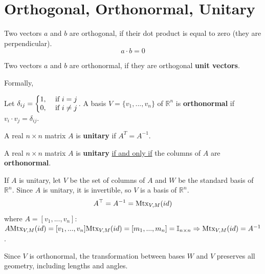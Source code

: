 \documentclass[11pt]{elegantbook}
\begin{document}
\section{Orthogonal, Orthonormal, Unitary}
Two vectors $a$ and $b$ are orthogonal, if their dot product is equal to zero (they are perpendicular). $$a\cdot b=0$$

Two vectors $a$ and $b$ are orthonormal, if they are orthogonal \textbf{unit vectors}.

Formally,
\begin{definition}[Orthonormal]
    \normalfont Let $\delta_{ij}=\left\{\begin{matrix}
        1,& \textnormal{ if }i=j\\
        0,& \textnormal{ if }i\neq j
    \end{matrix}\right.$. A basis $V = \{v_1, . . . , v_n\}$ of $\mathbb{R}^n$ is \textbf{orthonormal} if $v_i \cdot v_j = \delta_{ij}$.
\end{definition}


\begin{definition}[Unitary]
    \normalfont
    A real $n \times n$ matrix $A$ is \textbf{unitary} if $A^T=A^{-1}$.
\end{definition}


\begin{theorem}
    A real $n \times n$ matrix $A$ is \textbf{unitary} \underline{if and only if} the columns of $A$ are \textbf{orthonormal}.
\end{theorem}

If $A$ is unitary, let $V$ be the set of columns of $A$ and $W$ be the standard basis of $\mathbb{R}^n$. Since $A$ is unitary, it is invertible, so $V$ is a basis of $\mathbb{R}^n$.
$$
A^{\top}=A^{-1}=\textnormal{Mtx}_{V,M}(id)
$$
where $A=[v_1,...,v_n]$: $A\textnormal{Mtx}_{V,M}(id)=[v_1,...,v_n]\textnormal{Mtx}_{V,M}(id)=[m_1,...,m_n]=\mathbb{I}_{n\times n} \Rightarrow \textnormal{Mtx}_{V,M}(id)=A^{-1}$.

Since $V$ is orthonormal, the transformation between bases $W$ and $V$ preserves all geometry, including lengths and angles.
\end{document}
